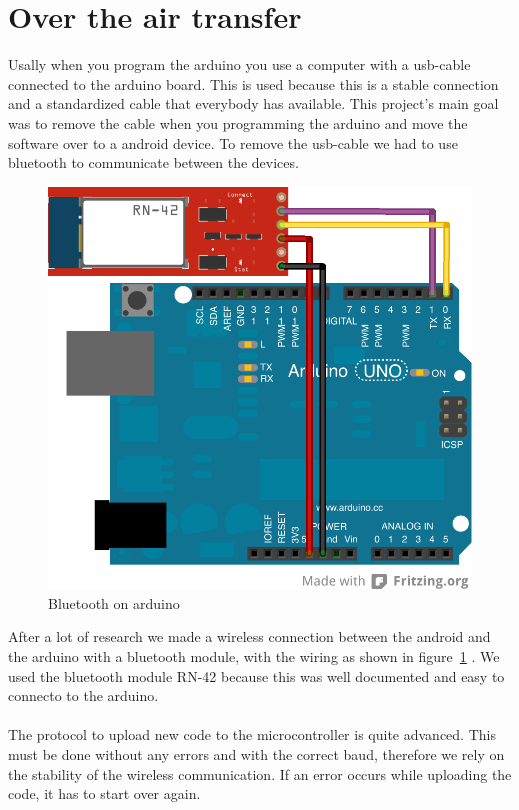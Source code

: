 \section{Over the air transfer}
Usally when you program the arduino you use a computer with a usb-cable connected to the arduino board. This is used because this is a stable connection and a standardized cable that everybody has available. This project's main goal was to remove the cable when you programming the arduino and move the software over to a android device. To remove the usb-cable we had to use bluetooth to communicate between the devices.
\\
\begin{figure}[H]
\includegraphics[scale=1.2]{images/wiring_simple.png}
\caption{Bluetooth on arduino}
\label{fig:SimpleArduinoWiring}
\end{figure}

After a lot of research we made a wireless connection between the android and the arduino with a bluetooth module, with the wiring as shown in figure~\ref{fig:SimpleArduinoWiring} . We used the bluetooth module RN-42 because this was well documented and easy to connecto to the arduino.\\
\\
The protocol to upload new code to the microcontroller is quite advanced. This must be done without any errors and with the correct baud, therefore we rely on the stability of the wireless communication. If an error occurs while uploading the code, it has to start over again.
